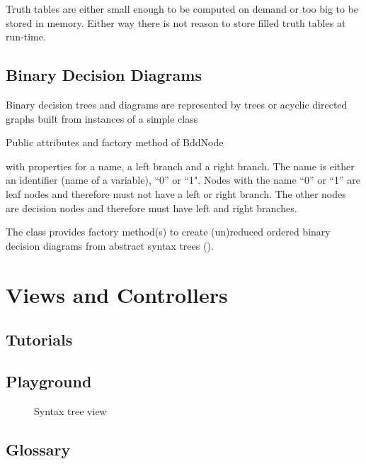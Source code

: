 Truth tables are either small enough to be computed on demand or too big to be stored in memory.
Either way there is not reason to store filled truth tables at run-time.

\subsection{Binary Decision Diagrams}

Binary decision trees and diagrams are represented by trees or acyclic directed graphs built from instances of a simple class
\begin{table}[htdp]
\begin{center}
\caption{Public attributes and factory method of BddNode}
\label{fig:BddNode}
\end{center}
\end{table}
 with properties for a name, a left branch and a right branch. The name is either an identifier (name of a variable), “0” or “1". 
Nodes with the name “0” or “1” are leaf nodes and therefore must not have a left or right branch.
The other nodes are decision nodes and therefore must have left and right branches. 

The class provides factory method(s) to create 
(un)reduced ordered binary decision diagrams from abstract syntax trees
().




\section{Views and Controllers}

\subsection{Tutorials}

\subsection{Playground}

\begin{figure}[htbp]
\begin{center}
\caption{Syntax tree view}
\label{fig:TreeView}
\end{center}
\end{figure}



\subsection{Glossary}

